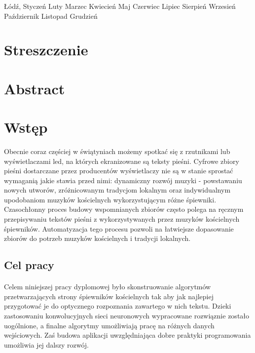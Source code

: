 \documentclass[a4paper,12pt]{article}
\newcommand{\MONTH}{%
  \ifcase\the\month
  \or Styczeń %
  \or Luty %
  \or Marzec %
  \or Kwiecień %
  \or Maj %
  \or Czerwiec %
  \or Lipiec %
  \or Sierpień %
  \or Wrzesień %
  \or Październik %
  \or Listopad %
  \or Grudzień %
  \fi}
\begin{document}
        \vspace*{90px}

        \fontsize{12pt}{0.2}\selectfont 
            \begin{center}Łódź, \MONTH \vspace{2cm}  \the\year \end{center} 
    \endgroup
    \newpage
	\setcounter{page}{2}
    \tableofcontents
	\newpage 

    \setcounter{secnumdepth}{0}
	\section{Streszczenie}
	\section{Abstract}
    \setcounter{secnumdepth}{1}
    
	\newpage 

	\section{Wstęp}
			\paragraph{} Obecnie coraz częściej w świątyniach możemy spotkać się z rzutnikami lub wyświetlaczami led, na których ekranizowane są teksty pieśni.
				Cyfrowe zbiory pieśni dostarczane przez producentów wyświetlaczy nie są w stanie sprostać wymaganią jakie stawia przed nimi: dynamiczny rozwój muzyki - powstawaniu nowych utworów, zróżnicowanym tradycjom lokalnym oraz indywidualnym upodobaniom muzyków kościelnych wykorzystującym różne śpiewniki.
				Czasochłonny proces budowy wspomnianych zbiorów często 
				polega na ręcznym przepisywaniu tekstów pieśni z wykorzystywanych przez muzyków kościelnych śpiewników.
				Automatyzacja tego procesu pozwoli na łatwiejsze dopasowanie zbiorów do potrzeb muzyków kościelnych i tradycji lokalnych. 
		
		\subsection{Cel pracy}
			\paragraph{\noindent}
				Celem niniejszej pracy dyplomowej było skonstruowanie algorytmów 
				przetwarzających strony śpiewników kościelnych tak aby jak najlepiej przygotować je do optycznego rozpoznania zawartego w nich tekstu. Dzieki zastosowaniu konwolucyjnych sieci neuronowych wypracowane rozwiąznie zostało uogólnione, a finalne algorytmy umożliwiają pracę na różnych danych wejściowych. Zaś budowa aplikacji uwzględniająca dobre praktyki programowania umożliwia jej dalszy rozwój.
	\newpage 
\end{document}
